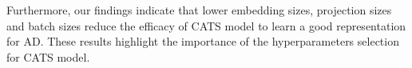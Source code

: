 Furthermore, our findings indicate that lower embedding sizes, projection sizes and batch sizes reduce the efficacy of CATS model to learn a good representation for AD. These results highlight the importance of the hyperparameters selection for CATS model.

